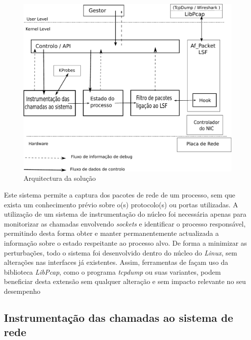 \documentclass[a4paper]{llncs}
\begin{document}
\begin{figure}[htbp]
\begin{center}
\includegraphics[scale=0.5]{interface.pdf} 
\caption{Arquitectura da solução}
\label{arquitectura}
\end{center}
\end{figure}


Este sistema permite a captura dos pacotes de rede de um processo, sem que exista um conhecimento prévio sobre o(s) protocolo(s) ou portas utilizadas.
 A utilização de um sistema de instrumentação do núcleo foi necessária apenas para monitorizar as chamadas envolvendo \emph{sockets} e identificar o processo responsável, permitindo desta forma obter e manter permanentemente actualizada a informação sobre o estado respeitante ao processo alvo.
 De forma a minimizar as perturbações, todo o sistema foi desenvolvido dentro do núcleo do \textit{Linux}, sem alterações nas interfaces já existentes.
 Assim, ferramentas de façam uso da biblioteca \textit{LibPcap}, como o programa \textit{tcpdump} ou suas variantes, podem beneficiar desta extensão sem qualquer alteração e sem impacto relevante no seu desempenho



\subsection*{Instrumentação das chamadas ao sistema de rede}
\label{sub:mon_syscalls}
\end{document}
